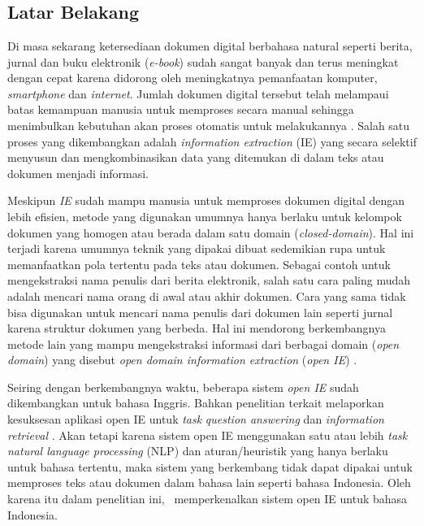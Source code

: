 \chapter{\babSatu}
\label{chap:babSatu}

\section{Latar Belakang}
Di masa sekarang ketersediaan dokumen digital berbahasa natural seperti berita, jurnal dan buku elektronik (\textit{e-book}) sudah sangat banyak dan terus meningkat dengan cepat karena didorong oleh meningkatnya pemanfaatan komputer, \textit{smartphone} dan \textit{internet}. Jumlah dokumen digital tersebut telah melampaui batas kemampuan manusia untuk memproses secara manual sehingga menimbulkan kebutuhan akan proses otomatis untuk melakukannya \citep{banko2007open}. Salah satu proses yang dikembangkan adalah \textit{information extraction} (IE) yang secara selektif menyusun dan mengkombinasikan data yang ditemukan di dalam teks atau dokumen menjadi informasi\citep{cowie1996information}.

Meskipun \textit{IE} sudah mampu manusia untuk memproses dokumen digital dengan lebih efisien, metode yang digunakan umumnya hanya berlaku untuk kelompok dokumen yang homogen atau berada dalam satu domain (\textit{closed-domain}). Hal ini terjadi karena umumnya teknik yang dipakai dibuat sedemikian rupa untuk memanfaatkan pola tertentu pada teks atau dokumen\citep{cowie1996information}. Sebagai contoh untuk mengekstraksi nama penulis dari berita elektronik, salah satu cara paling mudah adalah mencari nama orang di awal atau akhir dokumen. Cara yang sama tidak bisa digunakan untuk mencari nama penulis dari dokumen lain seperti jurnal karena struktur dokumen yang berbeda. Hal ini mendorong berkembangnya metode lain yang mampu mengekstraksi informasi dari berbagai domain (\textit{open domain}) yang disebut \textit{open domain information extraction} (\textit{open IE}) \citep{banko2007open}.

Seiring dengan berkembangnya waktu, beberapa sistem \textit{open IE} sudah dikembangkan \citep{schmitz2012open} untuk bahasa Inggris. Bahkan penelitian terkait melaporkan kesuksesan aplikasi open IE untuk \textit{task} \textit{question answering} \citep{fader2011identifying} dan \textit{information retrieval} \citep{etzioni2011search}. Akan tetapi karena sistem open IE menggunakan satu atau lebih \textit{task natural language processing} (NLP) dan aturan/heuristik yang hanya berlaku untuk bahasa tertentu, maka sistem yang berkembang tidak dapat dipakai untuk memproses teks atau dokumen dalam bahasa lain seperti bahasa Indonesia. Oleh karena itu dalam penelitian ini, \saya~memperkenalkan sistem open IE untuk bahasa Indonesia.

